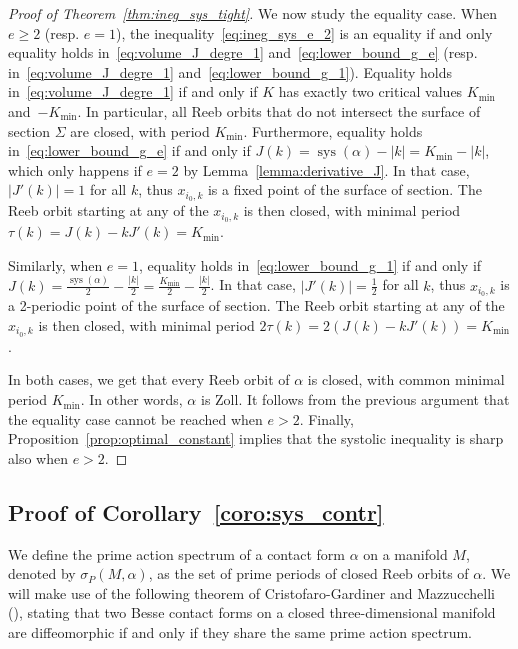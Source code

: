 \documentclass[AHL,Unicode,longabstracts]{cedram}
\DeclareMathOperator{\sys}{sys}
\begin{document}
\begin{proof}[{Proof of Theorem~\ref{thm:ineg_sys_tight}}]
We now study the equality case. When $e \geq 2$ (resp. $e=1$), the inequality~\eqref{eq:ineg_sys_e_2} is an equality if and only equality holds in~\eqref{eq:volume_J_degre_1} and~\eqref{eq:lower_bound_g_e} (resp. in~\eqref{eq:volume_J_degre_1} and~\eqref{eq:lower_bound_g_1}). Equality holds in~\eqref{eq:volume_J_degre_1} if and only if $K$ has exactly two critical values $K_{\min}$ and~$-K_{\min}$. In particular, all Reeb orbits that do not intersect the surface of section $\Sigma$ are closed, with period $K_{\min}$. Furthermore, equality holds in~\eqref{eq:lower_bound_g_e} if and only if $J(k) = \sys(\alpha) - |k| = K_{\min} - |k|$, which only happens if $e=2$ by Lemma~\ref{lemma:derivative_J}. In that case, $|J'(k)| = 1$ for all $k$, thus $x_{i_0,k}$ is a fixed point of the surface of section. The Reeb orbit starting at any of the $x_{i_0,k}$ is then closed, with minimal period $\tau(k) = J(k) - k J'(k) = K_{\min}$.

Similarly, when $e=1$, equality holds in~\eqref{eq:lower_bound_g_1} if and only if $J(k) = \frac{\sys(\alpha)}{2} - \frac{|k|}{2} = \frac{K_{\min}}{2} - \frac{|k|}{2}$. In that case, $|J'(k)| = \frac{1}{2}$ for all $k$, thus $x_{i_0,k}$ is a 2-periodic point of the surface of section. The Reeb orbit starting at any of the $x_{i_0,k}$ is then closed, with minimal period $2\tau(k) = 2(J(k) - k J'(k)) = K_{\min}$.

In both cases, we get that every Reeb orbit of $\alpha$ is closed, with common minimal period $K_{\min}$. In other words, $\alpha$ is Zoll. It follows from the previous argument that the equality case cannot be reached when $e>2$. Finally, Proposition~\ref{prop:optimal_constant} implies that the systolic inequality is sharp also when $e > 2$.
\end{proof}

\subsection{Proof of Corollary~\ref{coro:sys_contr}}\label{sub:proof_coro_contractible}

We define the prime action spectrum of a contact form $\alpha$ on a manifold $M$, denoted by $\sigma_P(M,\alpha)$, as the set of prime periods of closed Reeb orbits of $\alpha$. We will make use of the following theorem of Cristofaro-Gardiner and Mazzucchelli (\cite[Theorem~1.5]{MR4152621}), stating that two Besse contact forms on a closed three-dimensional manifold are diffeomorphic if and only if they share the same prime action spectrum.
\end{document}
